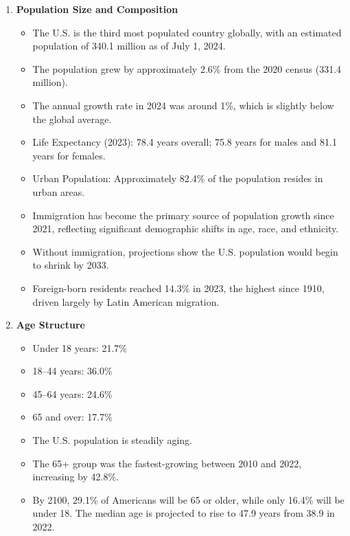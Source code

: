 \begin{enumerate}
    \item \textbf{Population Size and Composition}
    \begin{itemize}
        \item The U.S. is the third most populated country globally, with an estimated population of 340.1 million as of July 1, 2024.
        \item The population grew by approximately 2.6\% from the 2020 census (331.4 million).
        \item The annual growth rate in 2024 was around 1\%, which is slightly below the global average.
        \item Life Expectancy (2023): 78.4 years overall; 75.8 years for males and 81.1 years for females.
        \item Urban Population: Approximately 82.4\% of the population resides in urban areas.
        \item Immigration has become the primary source of population growth since 2021, reflecting significant demographic shifts in age, race, and ethnicity.
        \item Without immigration, projections show the U.S. population would begin to shrink by 2033.
        \item Foreign-born residents reached 14.3\% in 2023, the highest since 1910, driven largely by Latin American migration.
    \end{itemize}

    \item \textbf{Age Structure}
    \begin{itemize}
        \item Under 18 years: 21.7\%
        \item 18--44 years: 36.0\%
        \item 45--64 years: 24.6\%
        \item 65 and over: 17.7\%
        \item The U.S. population is steadily aging.
        \item The 65+ group was the fastest-growing between 2010 and 2022, increasing by 42.8\%.
        \item By 2100, 29.1\% of Americans will be 65 or older, while only 16.4\% will be under 18. The median age is projected to rise to 47.9 years from 38.9 in 2022.
    \end{itemize}


\end{enumerate}
